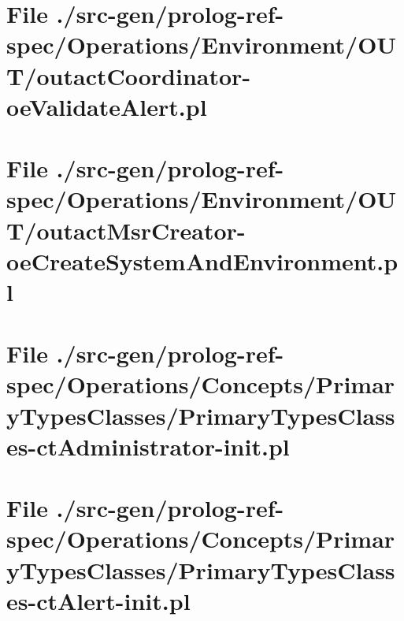 \section[File /src-gen/prolog-ref-spec.../outactCoordinator-oeValidateAlert.pl]{File ./src-gen/prolog-ref-spec/Operations/Environment/OUT/outactCoordinator-oeValidateAlert.pl}
\scriptsize

\normalsize
	
\section[File /src-gen.../outactMsrCreator-oeCreateSystemAndEnvironment.pl]{File ./src-gen/prolog-ref-spec/Operations/Environment/OUT/outactMsrCreator-oeCreateSystemAndEnvironment.pl}
\scriptsize

\normalsize
	
\section[File /src-gen/prolog-ref-spec.../PrimaryTypesClasses-ctAdministrator-init.pl]{File ./src-gen/prolog-ref-spec/Operations/Concepts/PrimaryTypesClasses/PrimaryTypesClasses-ctAdministrator-init.pl}
\scriptsize

\normalsize
	
\section[File /src-gen/prolog-ref-spec/Operations.../PrimaryTypesClasses-ctAlert-init.pl]{File ./src-gen/prolog-ref-spec/Operations/Concepts/PrimaryTypesClasses/PrimaryTypesClasses-ctAlert-init.pl}
\scriptsize

\normalsize
	
